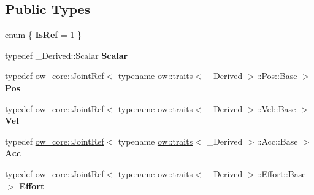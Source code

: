 \subsection*{Public Types}
\begin{DoxyCompactItemize}
\item 
enum \{ {\bfseries Is\+Ref} = 1
 \}\hypertarget{structow_1_1traits_3_01ow__core_1_1JointStateRef_3_01__Derived_01_4_01_4_a2daa1813d8897520113399447504b994}{}\label{structow_1_1traits_3_01ow__core_1_1JointStateRef_3_01__Derived_01_4_01_4_a2daa1813d8897520113399447504b994}

\item 
typedef \+\_\+\+Derived\+::\+Scalar {\bfseries Scalar}\hypertarget{structow_1_1traits_3_01ow__core_1_1JointStateRef_3_01__Derived_01_4_01_4_a9b4d721a405f1eafc8cfc7949d782e75}{}\label{structow_1_1traits_3_01ow__core_1_1JointStateRef_3_01__Derived_01_4_01_4_a9b4d721a405f1eafc8cfc7949d782e75}

\item 
typedef \hyperlink{classow__core_1_1JointRef}{ow\+\_\+core\+::\+Joint\+Ref}$<$ typename \hyperlink{structow_1_1traits}{ow\+::traits}$<$ \+\_\+\+Derived $>$\+::Pos\+::\+Base $>$ {\bfseries Pos}\hypertarget{structow_1_1traits_3_01ow__core_1_1JointStateRef_3_01__Derived_01_4_01_4_a4a65a1d03464c952ea3580cf77ce598e}{}\label{structow_1_1traits_3_01ow__core_1_1JointStateRef_3_01__Derived_01_4_01_4_a4a65a1d03464c952ea3580cf77ce598e}

\item 
typedef \hyperlink{classow__core_1_1JointRef}{ow\+\_\+core\+::\+Joint\+Ref}$<$ typename \hyperlink{structow_1_1traits}{ow\+::traits}$<$ \+\_\+\+Derived $>$\+::Vel\+::\+Base $>$ {\bfseries Vel}\hypertarget{structow_1_1traits_3_01ow__core_1_1JointStateRef_3_01__Derived_01_4_01_4_af004b209c43732d10d62b2c87cbc62b6}{}\label{structow_1_1traits_3_01ow__core_1_1JointStateRef_3_01__Derived_01_4_01_4_af004b209c43732d10d62b2c87cbc62b6}

\item 
typedef \hyperlink{classow__core_1_1JointRef}{ow\+\_\+core\+::\+Joint\+Ref}$<$ typename \hyperlink{structow_1_1traits}{ow\+::traits}$<$ \+\_\+\+Derived $>$\+::Acc\+::\+Base $>$ {\bfseries Acc}\hypertarget{structow_1_1traits_3_01ow__core_1_1JointStateRef_3_01__Derived_01_4_01_4_a7f3e665fa293233351881e466dd901de}{}\label{structow_1_1traits_3_01ow__core_1_1JointStateRef_3_01__Derived_01_4_01_4_a7f3e665fa293233351881e466dd901de}

\item 
typedef \hyperlink{classow__core_1_1JointRef}{ow\+\_\+core\+::\+Joint\+Ref}$<$ typename \hyperlink{structow_1_1traits}{ow\+::traits}$<$ \+\_\+\+Derived $>$\+::Effort\+::\+Base $>$ {\bfseries Effort}\hypertarget{structow_1_1traits_3_01ow__core_1_1JointStateRef_3_01__Derived_01_4_01_4_aaf7211e698eb2e993938e641d2a47296}{}\label{structow_1_1traits_3_01ow__core_1_1JointStateRef_3_01__Derived_01_4_01_4_aaf7211e698eb2e993938e641d2a47296}


\end{DoxyCompactItemize}
